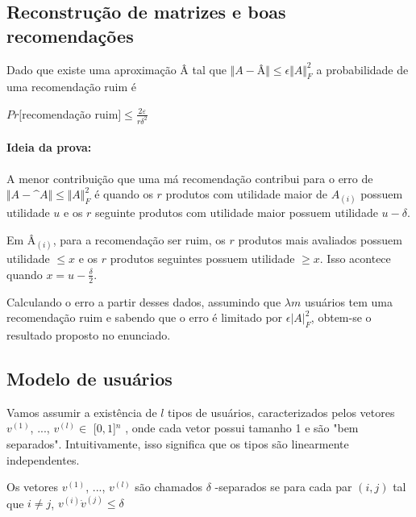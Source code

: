 \documentclass[a4paper,10pt]{article}
\begin{document}
\subsection{Reconstrução de matrizes e boas recomendações}

\begin{lema} \label{lema:box}
Dado que existe uma aproximação Â tal que $\Vert A - $Â$ \Vert \le \epsilon \Vert A \Vert^2_F$ a probabilidade de uma recomenda\c{c}\~ao
ruim é
 
$Pr [ $recomendação ruim$ ] \leq \frac{2\varepsilon}{r\delta^2}$

\end{lema}

\paragraph{Ideia da prova:}
  
A menor contribuição que uma má recomendação contribui para o erro de $\Vert A - \^A \Vert \le \Vert A \Vert^2_F$ é quando os $r$ produtos com utilidade maior de $A_{(i)}$ possuem utilidade $u$ e os $r$ seguinte produtos com utilidade maior possuem utilidade $u - \delta$.
 
   Em $Â_{(i)}$, para a recomendação ser ruim, os $r$ produtos mais avaliados possuem utilidade $\leq x$ e os $r$ produtos seguintes possuem utilidade $\geq x$. Isso acontece quando $x = u - \frac{\delta}{2}$. 

   Calculando o erro a partir desses dados, assumindo que $\lambda m$ usuários tem uma recomendação ruim e sabendo que o erro é limitado por $\epsilon \vert A \vert^2_F$, obtem-se o resultado proposto no enunciado.

\subsection{Modelo de usuários}

Vamos assumir a existência de $l$ tipos de usuários, caracterizados
pelos vetores $v^{(1)}$, ..., $v^{(l)} \in $ [$0,1$]$^n$
, onde cada vetor possui
tamanho 1 e são "bem separados". Intuitivamente, isso significa que os tipos
são linearmente independentes. 

\begin{definicao} \label{definicao:box} Os vetores $v^{(1)}$, ..., $v^{(l)}$ são chamados $\delta $ -separados se para
cada par $(i,j)$ tal que $i \neq j$, $v^{(i)} \dot v^{(j)} \leq \delta $
\end{definicao}
\end{document}
